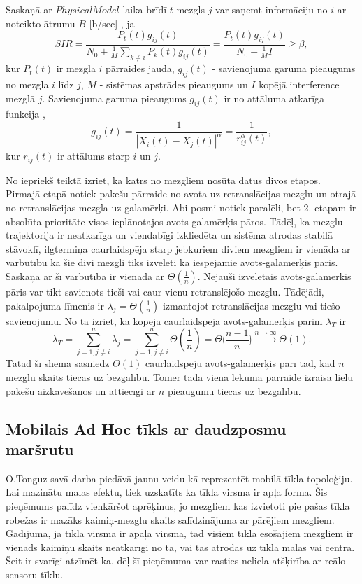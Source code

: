 Saskaņā ar $Physical Model$ laika brīdī $t$ mezgls $j$ var saņemt informāciju no $i$ ar noteikto ātrumu $B$ [b/sec] , ja
\begin{equation}
SIR=\frac{P_{t}(t)g_{ij}(t)}{N_{0}+\frac{1}{M}\sum\limits_{k\neq
i}P_{k}(t)g_{ij}(t)}=\frac{P_{t}(t)g_{ij}(t)}{N_{0}+\frac{1}{M}I}\geq\beta,
\end{equation}
kur $P_{t}(t)$ ir mezgla $i$ pārraides jauda, $g_{ij}(t)$ - savienojuma garuma pieaugums no mezgla $i$ līdz $j$, $M$ - sistēmas apstrādes pieaugums un $I$ kopējā interference mezglā $j$. Savienojuma garuma pieaugums $g_{ij}(t)$ ir no attāluma atkarīga funkcija \cite{grossglauser},
\begin{equation}
 g_{ij}(t)=\frac{1}{|X_{i}(t)-X_{j}(t)|^\alpha}=\frac{1}{r_{ij}^\alpha(t)},
\end{equation}
kur $r_{ij}(t)$ ir attālums starp $i$ un $j$.

No iepriekš teiktā izriet, ka katrs no mezgliem nosūta datus divos etapos. Pirmajā etapā notiek pakešu pārraide no avota uz retranslācijas mezglu un otrajā no retranslācijas mezgla uz galamērķi. Abi posmi notiek paralēli, bet  2. etapam ir absolūta prioritāte visos ieplānotajos avots-galamērķis pāros. Tādēļ, ka mezglu trajektorija ir neatkarīga un viendabīgi izkliedēta un sistēma atrodas stabilā stāvoklī, ilgtermiņa caurlaidspēja starp jebkuriem diviem mezgliem ir vienāda ar varbūtību ka šie divi mezgli tiks izvēlēti kā iespējamie avots-galamērķis pāris. Saskaņā ar \cite{grossglauser} šī varbūtība ir vienāda ar $\Theta(\frac{1}{n})$. Nejauši izvēlētais avots-galamērķis pāris var tikt savienots tieši vai caur vienu retranslējošo mezglu. Tādējādi, pakalpojuma līmenis ir $\lambda_{j} = \Theta(\frac{1}{n})$ izmantojot retranslācijas mezglu vai tiešo savienojumu. No tā izriet, ka kopējā caurlaidspēja avots-galamērķis pārim $\lambda_{T}$ ir
\begin{equation}
 \lambda_{T}=\sum\limits_{j=1, j\neq i}^{n}\lambda_{j}=\sum\limits_{j=1, j\neq
i}^{n}\Theta
(\frac{1}{n})=\Theta\lgroup\frac{n-1}{n}\rgroup\xrightarrow{
n\rightarrow\infty} \Theta(1).
\end{equation}
Tātad šī shēma sasniedz $\Theta(1)$ caurlaidspēju avots-galamērķis pārī tad, kad $n$ mezglu skaits tiecas uz bezgalību. Tomēr tāda viena lēkuma pārraide izraisa lielu pakešu aizkavēšanos un attiecīgi ar $n$ pieaugumu tiecas uz bezgalību.

\subsection{Mobilais Ad Hoc tīkls ar daudzposmu maršrutu}\label{sec:moby}
O.Tonguz savā darba \cite{qoS_mobility} piedāvā jaunu veidu kā reprezentēt mobilā tīkla topoloģiju. Lai mazinātu malas efektu, tiek uzskatīts ka tīkla virsma ir apļa  forma. Šis pieņēmums palīdz vienkāršot aprēķinus, jo mezgliem kas izvietoti pie pašas tīkla robežas ir mazāks kaimiņ-mezglu skaits salīdzinājuma ar pārējiem mezgliem. Gadījumā, ja tīkla virsma ir apaļa virsma, tad visiem tīklā esošajiem mezgliem ir vienāds kaimiņu skaits  neatkarīgi no tā, vai tas atrodas uz tīkla malas vai centrā. Šeit ir svarīgi atzīmēt ka, dēļ šī pieņēmuma var rasties neliela atšķirība ar reālo sensoru tīklu.

